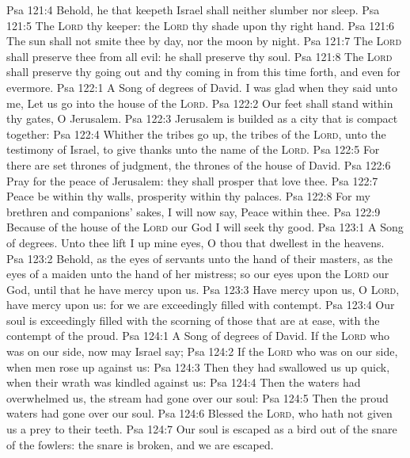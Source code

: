 \vs Psa 121:4 Behold, he that keepeth Israel shall neither slumber nor sleep.
\vs Psa 121:5 The \textsc{Lord}  thy keeper: the \textsc{Lord}  thy shade upon thy right hand.
\vs Psa 121:6 The sun shall not smite thee by day, nor the moon by night.
\vs Psa 121:7 The \textsc{Lord} shall preserve thee from all evil: he shall preserve thy soul.
\vs Psa 121:8 The \textsc{Lord} shall preserve thy going out and thy coming in from this time forth, and even for evermore.
\vs Psa 122:1 A Song of degrees of David. I was glad when they said unto me, Let us go into the house of the \textsc{Lord}.
\vs Psa 122:2 Our feet shall stand within thy gates, O Jerusalem.
\vs Psa 122:3 Jerusalem is builded as a city that is compact together:
\vs Psa 122:4 Whither the tribes go up, the tribes of the \textsc{Lord}, unto the testimony of Israel, to give thanks unto the name of the \textsc{Lord}.
\vs Psa 122:5 For there are set thrones of judgment, the thrones of the house of David.
\vs Psa 122:6 Pray for the peace of Jerusalem: they shall prosper that love thee.
\vs Psa 122:7 Peace be within thy walls,  prosperity within thy palaces.
\vs Psa 122:8 For my brethren and companions' sakes, I will now say, Peace  within thee.
\vs Psa 122:9 Because of the house of the \textsc{Lord} our God I will seek thy good.
\vs Psa 123:1 A Song of degrees. Unto thee lift I up mine eyes, O thou that dwellest in the heavens.
\vs Psa 123:2 Behold, as the eyes of servants  unto the hand of their masters,  as the eyes of a maiden unto the hand of her mistress; so our eyes  upon the \textsc{Lord} our God, until that he have mercy upon us.
\vs Psa 123:3 Have mercy upon us, O \textsc{Lord}, have mercy upon us: for we are exceedingly filled with contempt.
\vs Psa 123:4 Our soul is exceedingly filled with the scorning of those that are at ease,  with the contempt of the proud.
\vs Psa 124:1 A Song of degrees of David. If  the \textsc{Lord} who was on our side, now may Israel say;
\vs Psa 124:2 If  the \textsc{Lord} who was on our side, when men rose up against us:
\vs Psa 124:3 Then they had swallowed us up quick, when their wrath was kindled against us:
\vs Psa 124:4 Then the waters had overwhelmed us, the stream had gone over our soul:
\vs Psa 124:5 Then the proud waters had gone over our soul.
\vs Psa 124:6 Blessed  the \textsc{Lord}, who hath not given us  a prey to their teeth.
\vs Psa 124:7 Our soul is escaped as a bird out of the snare of the fowlers: the snare is broken, and we are escaped.
